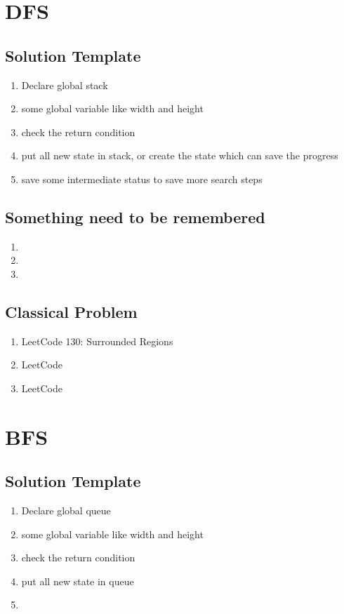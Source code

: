 \chapter{ DFS }
 

\section{ Solution Template }

 \begin{enumerate}
    \item  Declare global stack 

    \item  some global variable like width and height 
    
    \item  check the return condition 

    \item  put all new state in stack, or create the state which can save the progress 

    \item save some intermediate status to save more search steps

\end{enumerate}

\section{ Something need to be remembered }

\begin{enumerate}
    \item   
    \item
    \item

\end{enumerate}


\section{ Classical Problem }

\begin{enumerate}
    \item LeetCode 130: Surrounded Regions
    \item LeetCode  
    \item LeetCode  

\end{enumerate}

\chapter{ BFS }

\section{ Solution Template }

 \begin{enumerate}
    \item  Declare global queue

    \item  some global variable like width and height

    \item  check the return condition

    \item  put all new state in queue 

    \item

\end{enumerate}
